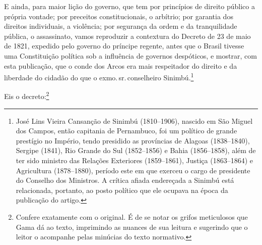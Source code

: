 {E ainda, para maior lição do governo, que tem por princípios de direito
público a própria vontade; por preceitos constitucionais, o arbítrio;
por garantia dos direitos individuais, a violência; por segurança da
ordem e da tranquilidade pública, o assassinato, vamos reproduzir a
contextura do Decreto de 23 de maio de 1821, expedido pelo governo do
príncipe regente, antes que o Brasil tivesse uma Constituição política
sob a influência de governos despóticos, e mostrar, com esta publicação,
que o conde dos Arcos era mais respeitador do direito e da liberdade do
cidadão do que o exmo.\,sr.\,conselheiro Sinimbú.\footnote{José Lins
  Vieira Cansanção de Sinimbú (1810--1906), nascido em São Miguel dos
  Campos, então capitania de Pernambuco, foi um político de grande
  prestígio no Império, tendo presidido as províncias de Alagoas
  (1838--1840), Sergipe (1841), Rio Grande do Sul (1852--1856) e Bahia
  (1856--1858), além de ter sido ministro das Relações Exteriores
  (1859--1861), Justiça (1863--1864) e Agricultura (1878--1880), período
  este em que exerceu o cargo de presidente do Conselho dos Ministros. A
  crítica afiada endereçada a Sinimbú está relacionada, portanto, ao
  posto político que ele ocupava na época da publicação do artigo.}

Eis o decreto:\footnote{Confere exatamente com o original. É de se
  notar os grifos meticulosos que Gama dá ao texto, imprimindo as
  nuances de sua leitura e sugerindo que o leitor o acompanhe pelas
  minúcias do texto normativo.}

}
